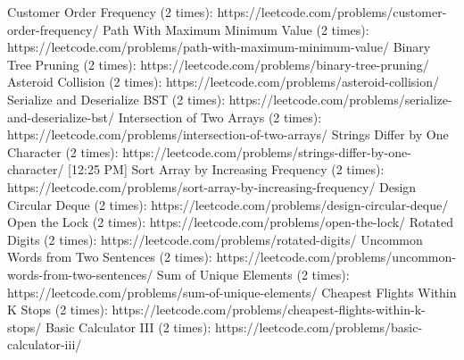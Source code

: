 Customer Order Frequency (2 times): https://leetcode.com/problems/customer-order-frequency/
Path With Maximum Minimum Value (2 times): https://leetcode.com/problems/path-with-maximum-minimum-value/
Binary Tree Pruning (2 times): https://leetcode.com/problems/binary-tree-pruning/
Asteroid Collision (2 times): https://leetcode.com/problems/asteroid-collision/
Serialize and Deserialize BST (2 times): https://leetcode.com/problems/serialize-and-deserialize-bst/
Intersection of Two Arrays (2 times): https://leetcode.com/problems/intersection-of-two-arrays/
Strings Differ by One Character (2 times): https://leetcode.com/problems/strings-differ-by-one-character/
[12:25 PM]
Sort Array by Increasing Frequency (2 times): https://leetcode.com/problems/sort-array-by-increasing-frequency/
Design Circular Deque (2 times): https://leetcode.com/problems/design-circular-deque/
Open the Lock (2 times): https://leetcode.com/problems/open-the-lock/
Rotated Digits (2 times): https://leetcode.com/problems/rotated-digits/
Uncommon Words from Two Sentences (2 times): https://leetcode.com/problems/uncommon-words-from-two-sentences/
Sum of Unique Elements (2 times): https://leetcode.com/problems/sum-of-unique-elements/
Cheapest Flights Within K Stops (2 times): https://leetcode.com/problems/cheapest-flights-within-k-stops/
Basic Calculator III (2 times): https://leetcode.com/problems/basic-calculator-iii/